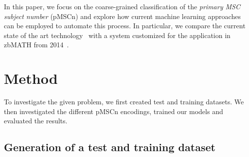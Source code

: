 In this paper, we focus on the coarse-grained classification of the \emph{primary MSC subject number} (pMSCn) and explore how current machine learning approaches can be employed to automate this process.
In particular, we compare the current state of the art technology~\cite{Scharpf2020} with a system customized for the application in zbMATH from 2014~\cite{SchonebergS14}.\\
%
\noindent{}

\section{Method}\label{sec:method}


To investigate the given problem, we first created test and training datasets.
We then investigated the different pMSCn encodings, trained our models and evaluated the results.

\subsection{Generation of a test and training dataset}

